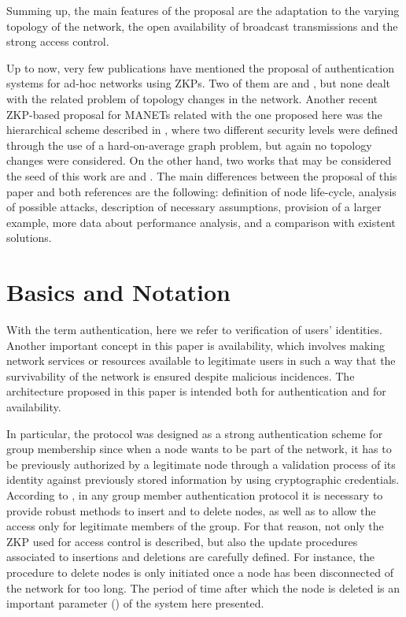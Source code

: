 \documentclass{article}
\begin{document}
Summing up, the
main features of the proposal are the adaptation to the
varying topology of the network, the open availability of
broadcast transmissions and the strong access control.

Up to now, very few
publications have  mentioned the proposal of authentication
systems for ad-hoc networks using ZKPs. Two of them are \cite{ARMF06} and
\cite{WZK05}, but none dealt with the related problem
of topology changes in the network. Another recent ZKP-based proposal for MANETs related with the one proposed
here was the hierarchical scheme described in \cite{CH06}, where two different security
levels were defined through the use of a hard-on-average graph
problem, but again no topology changes were considered. On the other hand,  two works that may be considered the seed of this work are  \cite{CC07} and \cite{CCMQ07}. The main differences between the proposal of this paper and both references are the following:  definition of node life-cycle, analysis of possible attacks,  description of necessary assumptions,  provision of a larger example, more data about performance analysis, and a comparison with existent solutions.

\section{Basics and Notation}
\label{Overview}
\label{BasicsandNotation}

With the term authentication, here we refer to  verification  of users' identities. Another important concept in this paper is availability, which involves making network services or resources available to  legitimate users in such a way that the survivability of the network is ensured despite malicious incidences. The  architecture proposed in this paper is intended both for authentication and for availability.

In particular, the protocol was designed as a strong authentication scheme for
group membership since when a node wants to be part of the
network, it has to be previously authorized by a legitimate node through a validation process of its identity against previously stored information by using cryptographic credentials.  
According to \cite{MAH00}, in any group member
authentication protocol it is necessary to provide robust methods
to insert and to delete nodes, as well as to allow the access only
for legitimate members of the group. For that reason, not only the
ZKP used for access control is described, but also the
update procedures associated to insertions and deletions are
carefully defined. For instance, the procedure to delete nodes is only initiated once a node has been
disconnected of the network for too long. The period of time after which the node is deleted is an important parameter () of the system here presented.
\end{document}
